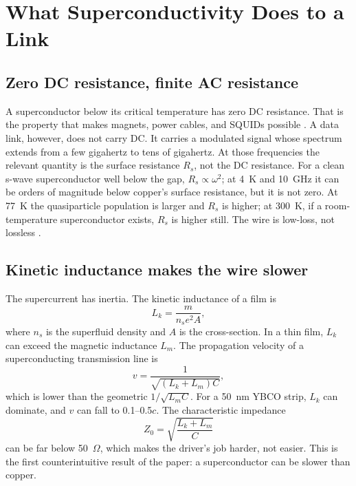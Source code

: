 \documentclass[10pt,letterpaper]{article}
\begin{document}
\section{What Superconductivity Does to a Link}
\label{sec:physics}

\subsection{Zero DC resistance, finite AC resistance}

A superconductor below its critical temperature has zero DC resistance. That is the property that makes magnets, power cables, and SQUIDs possible \cite{tinkham}. A data link, however, does not carry DC. It carries a modulated signal whose spectrum extends from a few gigahertz to tens of gigahertz. At those frequencies the relevant quantity is the surface resistance $R_s$, not the DC resistance. For a clean s-wave superconductor well below the gap, $R_s \propto \omega^2$; at 4~K and 10~GHz it can be orders of magnitude below copper's surface resistance, but it is not zero. At 77~K the quasiparticle population is larger and $R_s$ is higher; at 300~K, if a room-temperature superconductor exists, $R_s$ is higher still. The wire is low-loss, not lossless \cite{pozar}.

\subsection{Kinetic inductance makes the wire slower}

The supercurrent has inertia. The kinetic inductance of a film is
\begin{equation}
L_k = \frac{m}{n_s e^2 A},
\end{equation}
where $n_s$ is the superfluid density and $A$ is the cross-section. In a thin film, $L_k$ can exceed the magnetic inductance $L_m$. The propagation velocity of a superconducting transmission line is
\begin{equation}
v = \frac{1}{\sqrt{(L_k+L_m)C}},
\end{equation}
which is lower than the geometric $1/\sqrt{L_m C}$. For a 50~nm YBCO strip, $L_k$ can dominate, and $v$ can fall to 0.1--0.5$c$. The characteristic impedance
\begin{equation}
Z_0 = \sqrt{\frac{L_k+L_m}{C}}
\end{equation}
can be far below 50~$\Omega$, which makes the driver's job harder, not easier. This is the first counterintuitive result of the paper: a superconductor can be slower than copper.
\end{document}
